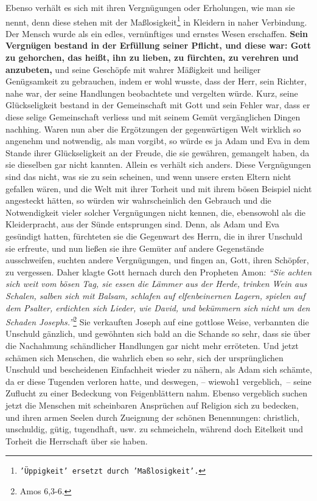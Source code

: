 Ebenso verhält es sich mit ihren Vergnügungen oder Erholungen,
wie man sie
nennt, denn diese stehen mit der
Maßlosigkeit\footnote{\texttt{'Üppigkeit' ersetzt durch 'Maßlosigkeit'.}} in
Kleidern in naher
Verbindung. Der
Mensch wurde als ein edles, vernünftiges und ernstes Wesen erschaffen.
\textbf{Sein
Vergnügen bestand in der Erfüllung seiner Pflicht, und diese war: Gott zu
gehorchen, das heißt, ihn zu lieben, zu fürchten, zu verehren und anzubeten,}
und
seine Geschöpfe mit wahrer Mäßigkeit und heiliger Genügsamkeit zu gebrauchen,
indem er wohl wusste, dass der Herr, sein Richter, nahe war, der seine
Handlungen
beobachtete und vergelten würde. Kurz, seine Glückseligkeit bestand in der
Gemeinschaft mit Gott und sein Fehler war, dass er diese selige Gemeinschaft
verliess und mit seinem Gemüt vergänglichen Dingen nachhing. Waren nun aber
die Ergötzungen der gegenwärtigen Welt wirklich so angenehm und notwendig, als
man vorgibt, so würde es ja Adam und Eva in dem Stande ihrer Glückseligkeit an
der Freude, die sie gewähren, gemangelt haben, da sie dieselben gar nicht
kannten. Allein es verhält sich anders. Diese Vergnügungen sind das nicht, was
sie zu sein scheinen, und wenn unsere ersten Eltern nicht gefallen wären, und
die Welt mit ihrer Torheit und mit ihrem bösen Beispiel nicht angesteckt
hätten, so würden wir wahrscheinlich den Gebrauch und die Notwendigkeit vieler
solcher Vergnügungen nicht kennen, die, ebensowohl als die Kleiderpracht, aus
der Sünde entsprungen sind.  Denn, als Adam und Eva gesündigt
hatten, fürchteten
sie die Gegenwart des Herrn, die in ihrer Unschuld sie erfreute, und nun ließen
sie ihre Gemüter auf andere Gegenstände ausschweifen, suchten andere
Vergnügungen, und fingen an, Gott, ihren Schöpfer, zu vergessen. Daher klagte
Gott hernach durch den Propheten Amon:
\textit{"`Sie achten sich weit vom bösen Tag,
sie essen die Lämmer aus der Herde, trinken Wein aus Schalen, salben sich mit
Balsam, schlafen auf elfenbeinernen Lagern, spielen auf dem Psalter, erdichten
sich Lieder, wie David, und bekümmern sich nicht um den Schaden
Josephs."'}\footnote{Amos 6,3-6.}
Sie verkauften Joseph auf eine gottlose
Weise, verbannten die Unschuld gänzlich, und gewöhnten sich bald an die Schande
so sehr, dass sie über die Nachahmung schändlicher Handlungen gar nicht mehr
erröteten. Und jetzt schämen sich Menschen, die wahrlich eben so sehr, sich der
ursprünglichen Unschuld und bescheidenen Einfachheit wieder zu nähern, als Adam
sich schämte, da er diese Tugenden verloren hatte, und deswegen, -- wiewoh1
vergeblich,~-- seine Zuflucht zu einer Bedeckung von Feigenblättern nahm. Ebenso
vergeblich suchen jetzt die Menschen mit scheinbaren Ansprüchen auf Religion
sich zu bedecken, und ihren armen Seelen durch Zueignung der schönen
Benennungen: christlich, unschuldig, gütig, tugendhaft, usw. zu schmeicheln,
während doch Eitelkeit und Torheit die Herrschaft über sie haben.

